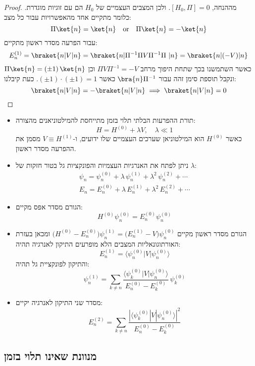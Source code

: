 \documentclass{tstextbook}
\begin{document}
\begin{proof}
מההנחה, \(\left[ H_{0},\Pi \right]=0\). ולכן המצבים העצמיים של \(H_{0}\) הם עם זוגיות מוגדרת. כלומר מתקיים אחד מהאפשרויות עבור כל מצב:
$$\Pi \ket{n} =\ket{n} \quad \text{or}\quad \Pi \ket{n} =-\ket{n} $$
עבור הפרעה מסדר ראשון מתקיים:
$$E^{(1)}_{n}=\braket{ n | V|n } =\braket{ n|\Pi ^{-1} \Pi V\Pi ^{-1}\Pi  | n }= \braket{ n | (-V)|n } $$
כאשר השתמשנו בכך שתחת היפוך מרחב \(\Pi V\Pi ^{-1} = -V\) וכן \(\Pi \ket{n}=\left( \pm 1 \right)\ket{n}\) ונקבל תוספת סימן זהה עבור \(\bra{n}\Pi ^{-1}\) כאשר \(\left( \pm 1 \right)\cdot\left( \pm 1 \right)=1\). כעת קיבלנו:
$$\braket{ n|V | n } =-\braket{ n|V | n } \implies \braket{ n|V | n } =0$$

\end{proof}
\begin{summary}
  \begin{itemize}
    \item תורת ההפרעות הבלתי תלוי בזמן מתייחסת להמילטוניאנים מהצורה:
$$H=H^{(0)}+\lambda V,\quad\lambda\ll1$$
כאשר \(H^{(0)}\) הוא המילטוניאן שערכים העצמיים שלו ידועים, ו-\(V \equiv H^{(1)}\) מסמן את ההפרעה מסדר ראשון.
    \item ניתן לפתח את האנרגיות העצמיות והפונקציות גל בטור חזקות של \(\lambda\):
$$\begin{array}{l} {{\psi_{n}=\psi_{n}^{(0)}+\lambda\,\psi_{n}^{(1)}+\lambda^{2}\,\psi_{n}^{(2)}+\cdots}}\\ {{E_{n}=E_{n}^{(0)}+\lambda\,E_{n}^{(1)}+\lambda^{2}\,E_{n}^{(2)}+\cdots}}\end{array}$$
    \item הגורם מסדר אפס מקיים:
$$H^{(0)}\psi_{n}^{(0)}=E_{n}^{(0)}\psi_{n}^{(0)}$$
    \item הגורם מסדר ראשון מקיים \(\big(H^{(0)}-E_{n}^{(0)}\big)\psi_{n}^{(1)}=\big(E_{n}^{(1)}-V\big)\psi_{n}^{(0)}\) ומכאן בעזרת האורתוגונאליות המצבים הלא מופרעים התיקון לאנרגיה תהיה:
$$E_{n}^{(1)}=\langle\psi_{n}^{(0)}|V|\psi_{n}^{(0)}\rangle$$
והתיקון לפונקציית גל תהיה:
$$\psi_{n}^{(1)}=\sum_{k\neq n}\frac{\langle\psi_{k}^{(0)}|V|\psi_{n}^{(0)}\rangle}{E_{n}^{(0)}-E_{k}^{(0)}}\,\psi_{k}^{(0)}$$
    \item מסדר שני התיקון לאנרגיה יקיים:
$$E_{n}^{(2)}=\sum_{k\neq n}\frac{|\langle\psi_{k}^{(0)}|V|\psi_{n}^{(0)}\rangle|^{2}}{E_{n}^{(0)}-E_{k}^{(0)}}$$
  \end{itemize}
\end{summary}
\subsection{מנוונת שאינו תלוי בזמן}
\end{document}
